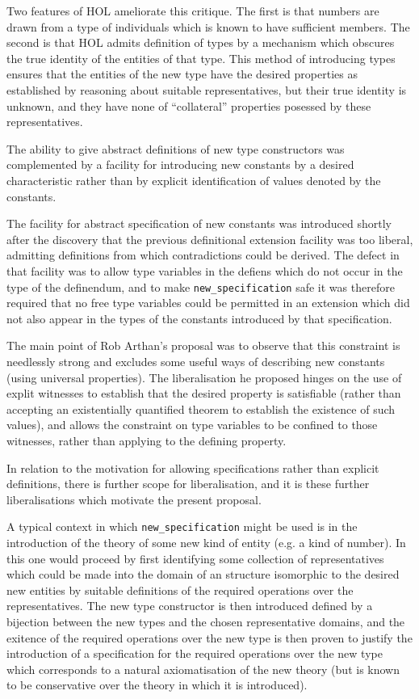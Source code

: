 \documentclass[12pt]{article}
\def\NewSpec{{\tt new\_specification}}
\begin{document}
Two features of HOL ameliorate this critique.
The first is that numbers are drawn from a type of individuals which is known to have sufficient members.
The second is that HOL admits definition of types by a mechanism which obscures the true identity of the entities of that type.
This method of introducing types ensures that the entities of the new type have the desired properties as established by reasoning about suitable representatives, but their true identity is unknown, and they have none of ``collateral'' properties posessed by these representatives.

The ability to give abstract definitions of new type constructors was complemented by a facility for introducing new constants by a desired characteristic rather than by explicit identification of values denoted by the constants.

The facility for abstract specification of new constants was introduced shortly after the discovery that the previous definitional extension facility was too liberal, admitting definitions from which contradictions could be derived.
The defect in that facility was to allow type variables in the defiens which do not occur in the type of the definendum, and to make {\NewSpec} safe it was therefore required that no free type variables could be permitted in an extension which did not also appear in the types of the constants introduced by that specification.

The main point of Rob Arthan's proposal was to observe that this constraint is needlessly strong and excludes some useful ways of describing new constants (using universal properties).
The liberalisation he proposed hinges on the use of explit witnesses to establish that the desired property is satisfiable (rather than accepting an existentially quantified theorem to establish the existence of such values), and allows the constraint on type variables to be confined to those witnesses, rather than applying to the defining property.

In relation to the motivation for allowing specifications rather than explicit definitions, there is further scope for liberalisation, and it is these further liberalisations which motivate the present proposal.

A typical context in which {\NewSpec} might be used is in the introduction of the theory of some new kind of entity (e.g. a kind of number).
In this one would proceed by first identifying some collection of representatives which could be made into the domain of an structure isomorphic to the desired new entities by suitable definitions of the required operations over the representatives.
The new type constructor is then introduced defined by a bijection between the new types and the chosen representative domains, and the exitence of the required operations over the new type is then proven to justify the introduction of a specification for the required operations over the new type which corresponds to a natural axiomatisation of the new theory (but is known to be conservative over the theory in which it is introduced).
\end{document}
